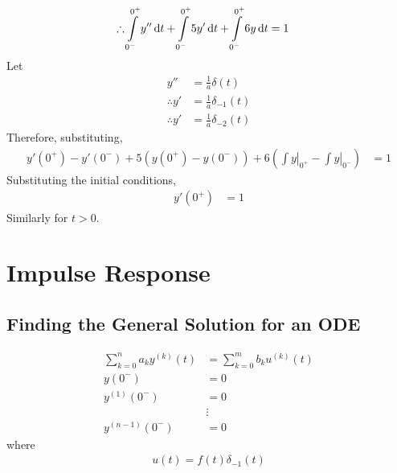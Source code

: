 \documentclass[fleqn, a4paper, 12pt, twoside]{article}
\theoremstyle{definition}
\theoremstyle{theorem}
\begin{document}
\begin{solution}
\begin{align*}
		\therefore \int\limits_{0^-}^{0^+} y'' \dif t + \int\limits_{0^-}^{0^+} 5 y' \dif t + \int\limits_{0^-}^{0^+} 6 y \dif t & = 1
	\end{align*}
	Let
	\begin{align*}
		y''           & = \frac{1}{a} \delta(t)      \\
		\therefore y' & = \frac{1}{a} \delta_{-1}(t) \\
		\therefore y' & = \frac{1}{a} \delta_{-2}(t)
	\end{align*}
	Therefore, substituting,
	\begin{align*}
		y'(0^+) - y'(0^-) + 5 \left( y(0^+) - y(0^-) \right) + 6 \left( \left. \int y \right|_{0^+} - \left. \int y \right|_{0^-} \right) & = 1
	\end{align*}
	Substituting the initial conditions,
	\begin{align*}
		y'(0^+) & = 1
	\end{align*}
	Similarly for $t > 0$.
\end{solution}

\section{Impulse Response}

\subsection{Finding the General Solution for an ODE}

		\begin{align*}
			\sum\limits_{k = 0}^{n} a_k y^{(k)}(t) & = \sum\limits_{k = 0}^{m} b_k u^{(k)}(t) \\
			y(0^-)                                 & = 0                                      \\
			y^{(1)}(0^-)                           & = 0                                      \\
                                                               & \vdots                                   \\
			y^{(n - 1)}(0^-)                       & = 0
		\end{align*}
		where
		\begin{align*}
			u(t) = f(t) \delta_{-1}(t)
		\end{align*}
\end{document}
